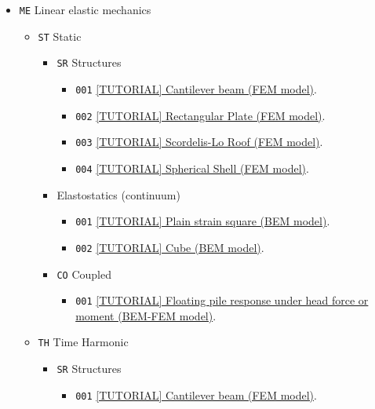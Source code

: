 \documentclass{article}
\begin{document}
\begin{itemize}
    \item \texttt{ME} Linear elastic mechanics
    \begin{itemize}
        \item \texttt{ST} Static
        \begin{itemize}
            \item \texttt{SR} Structures
            \begin{itemize}
                \item \texttt{001} \href{ME-ST-SR-001/ME-ST-SR-001.pdf}{[TUTORIAL] Cantilever beam (FEM model)}.
                \item \texttt{002} \href{ME-ST-SR-002/ME-ST-SR-002.pdf}{[TUTORIAL] Rectangular Plate (FEM model)}.
                \item \texttt{003} \href{ME-ST-SR-003/ME-ST-SR-003.pdf}{[TUTORIAL] Scordelis-Lo Roof (FEM model)}.
                \item \texttt{004} \href{ME-ST-SR-004/ME-ST-SR-004.pdf}{[TUTORIAL] Spherical Shell (FEM model)}.
            \end{itemize}
            \item[\texttt{EL}] Elastostatics (continuum)
            \begin{itemize}
                \item \texttt{001} \href{ME-ST-EL-001/ME-ST-EL-001.pdf}{[TUTORIAL] Plain strain square (BEM model)}.
                \item \texttt{002} \href{ME-ST-EL-002/ME-ST-EL-002.pdf}{[TUTORIAL] Cube (BEM model)}.
            \end{itemize}            
            \item \texttt{CO} Coupled 
            \begin{itemize}
                \item \texttt{001} \href{ME-ST-CO-001/ME-ST-CO-001.pdf}{[TUTORIAL] Floating pile response under head force or moment (BEM-FEM model)}.
            \end{itemize}             
        \end{itemize}
        \item \texttt{TH} Time Harmonic
        \begin{itemize}
            \item \texttt{SR} Structures
            \begin{itemize}
                \item \texttt{001} \href{ME-TH-SR-001/ME-TH-SR-001.pdf}{[TUTORIAL] Cantilever beam (FEM model)}.

\end{itemize}
\end{itemize}
\end{itemize}
\end{itemize}
\end{document}
